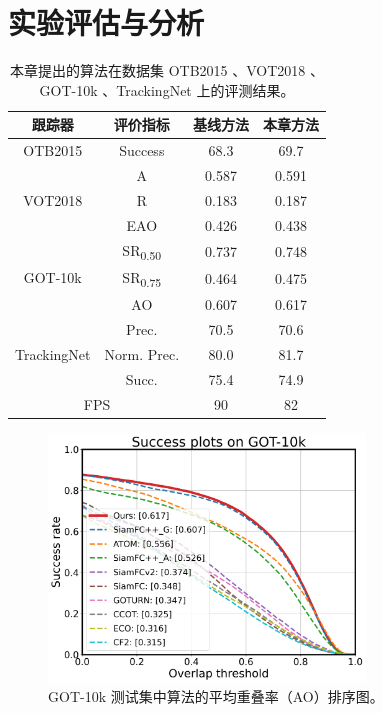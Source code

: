 \section{实验评估与分析}
\begin{table}[t]
\caption{本章提出的算法在数据集 OTB2015 \cite{OTB2015}、VOT2018 \cite{kristan2018sixth}、GOT-10k \cite{GOT-10k}、TrackingNet \cite{muller2018trackingnet} 上的评测结果。}
\begin{center}
\begin{tabular}{c cc c}
\toprule
跟踪器 & 评价指标 & 基线方法 & 本章方法\\
\midrule
\multirow{1}{*}{OTB2015 \cite{OTB2015}} 
& Success & 68.3 & 69.7\\
\midrule
\multirow{3}{*}{VOT2018 \cite{kristan2018sixth}}
& A   & 0.587 & 0.591 \\
& R   & 0.183 & 0.187 \\
& EAO & 0.426 & 0.438 \\
\midrule
\multirow{3}{*}{GOT-10k \cite{GOT-10k}} 
& SR\textsubscript{0.50} &  0.737 & 0.748 \\
& SR\textsubscript{0.75} & 0.464 & 0.475 \\
& AO & 0.607 & 0.617 \\
\midrule
\multirow{3}{*}{TrackingNet \cite{muller2018trackingnet}} 
& Prec.       & 70.5 & 70.6 \\
& Norm. Prec. & 80.0 & 81.7 \\
& Succ.       & 75.4 & 74.9 \\
\midrule
\multicolumn{2}{c}{FPS} & 90 & 82\\
\bottomrule
\end{tabular}
\end{center}
\label{tab:benchmark results}
\end{table}

\begin{figure}[t]
    \centering
    \includegraphics[width=0.75\textwidth]{Img/MTP/got10k/success_plot.png}
    \caption{GOT-10k \cite{GOT-10k} 测试集中算法的平均重叠率（AO）排序图。}
    \label{fig:got10k}
\end{figure}

